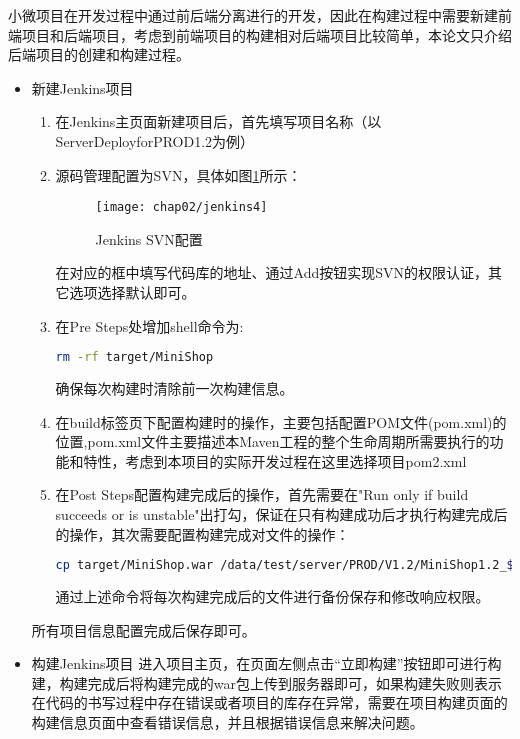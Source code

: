 小微项目在开发过程中通过前后端分离进行的开发，因此在构建过程中需要新建前端项目和后端项目，考虑到前端项目的构建相对后端项目比较简单，本论文只介绍后端项目的创建和构建过程。
\begin{itemize}
\item 新建Jenkins项目
\begin{enumerate}
\item 在Jenkins主页面新建项目后，首先填写项目名称（以ServerDeployforPROD1.2为例）
\item 源码管理配置为SVN，具体如图\ref{fig:jenkins4}所示：
\begin{figure}[H] %
  \centering
  \texttt{[image: chap02/jenkins4]}
  \caption{Jenkins SVN配置}
  \label{fig:jenkins4}
\end{figure}
在对应的框中填写代码库的地址、通过Add按钮实现SVN的权限认证，其它选项选择默认即可。
\item 在Pre Steps处增加shell命令为:
\begin{lstlisting}[language=bash,numbers=none]
rm -rf target/MiniShop
\end{lstlisting}
确保每次构建时清除前一次构建信息。
\item 在build标签页下配置构建时的操作，主要包括配置POM文件(pom.xml)的位置,pom.xml文件主要描述本Maven工程的整个生命周期所需要执行的功能和特性\cite{mileva2009mining}，考虑到本项目的实际开发过程在这里选择项目pom2.xml
\item 在Post Steps配置构建完成后的操作，首先需要在"Run only if build succeeds or is unstable"出打勾，保证在只有构建成功后才执行构建完成后的操作，其次需要配置构建完成对文件的操作：
\begin{lstlisting}[language=bash,numbers=none]
cp target/MiniShop.war /data/test/server/PROD/V1.2/MiniShop1.2_$(date +%Y%m%d)_$BUILD_NUMBER.war && chmod 777 /data/test/server/PROD/V1.2/MiniShop1.2_$(date +%Y%m%d)_$BUILD_NUMBER.war
\end{lstlisting}
通过上述命令将每次构建完成后的文件进行备份保存和修改响应权限。
\end{enumerate}
所有项目信息配置完成后保存即可。
\item 构建Jenkins项目
进入项目主页，在页面左侧点击“立即构建”按钮即可进行构建，构建完成后将构建完成的war包上传到服务器即可，如果构建失败则表示在代码的书写过程中存在错误或者项目的库存在异常，需要在项目构建页面的构建信息页面中查看错误信息，并且根据错误信息来解决问题。
\end{itemize}
